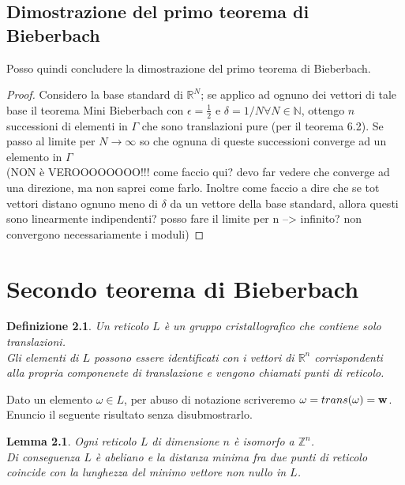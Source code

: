 \documentclass[12pt,a4paper]{book}
\newtheorem{definition}{Definizione}[section]
\newtheorem{lemma}[theorem]{Lemma}
\begin{document}
\section{Dimostrazione del primo teorema di Bieberbach}

Posso quindi concludere la dimostrazione del primo teorema di Bieberbach.

\begin{proof}
Considero la base standard di $\mathbb{R}^N$; se applico ad ognuno dei vettori di tale base il teorema Mini Bieberbach con $\epsilon = \frac{1}{2}$ e $\delta = 1/N \forall N \in \mathbb{N}$, ottengo $n$ successioni di elementi in $\Gamma$ che sono translazioni pure (per il teorema 6.2). 
Se passo al limite per $N \longrightarrow \infty$ so che ognuna di queste successioni converge ad un elemento in $\Gamma$ \\
 (NON è VEROOOOOOOO!!! come faccio qui? devo far vedere che converge ad una direzione, ma non saprei come farlo. Inoltre come faccio a dire che se tot vettori distano ognuno meno di $\delta $ da un vettore della base standard, allora questi sono linearmente indipendenti? posso fare il limite per n --> infinito? non convergono necessariamente i moduli)
\end{proof}

\chapter{Secondo teorema di Bieberbach}

\begin{definition}
Un reticolo $L$ è un gruppo cristallografico che contiene solo translazioni. \\
Gli elementi di $L$ possono essere identificati con i vettori di $\mathbb{R}^n$ corrispondenti alla propria componenete di translazione e vengono chiamati punti di reticolo. 
\end{definition}

Dato un elemento $\omega \in L$, per abuso di notazione scriveremo $\omega = trans(\omega) = \vb{w}$. 
Enuncio il seguente risultato senza disubmostrarlo.
\begin{lemma}
Ogni reticolo $L$ di dimensione $n$ è isomorfo a $\mathbb{Z}^n$. \\
Di conseguenza $L$ è abeliano e la distanza minima fra due punti di reticolo coincide con la lunghezza del minimo vettore non nullo in $L$.  
\end{lemma}
\end{document}
